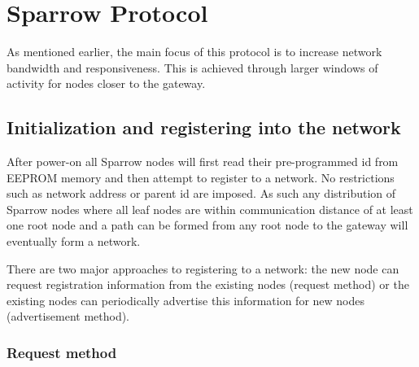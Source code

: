 
\chapter{Sparrow Protocol}




As mentioned earlier, the main focus of this protocol is to increase network
bandwidth and responsiveness. This is achieved through larger windows of
activity for nodes closer to the gateway. 

\section{Initialization and registering into the network}

After power-on all Sparrow nodes will first read their pre-programmed id from
\mbox{EEPROM} memory and then attempt to register to a network. No restrictions
such as network address or parent id are imposed. As such any distribution of
Sparrow nodes where all leaf nodes are within communication distance of at
least one root node and a path can be formed from any root node to the gateway
will eventually form a network. 

There are two major approaches to registering to a network: the new node can
request registration information from the existing nodes (request method) or
the existing nodes can periodically advertise this information for new nodes
(advertisement method). 

\subsection{Request method}

